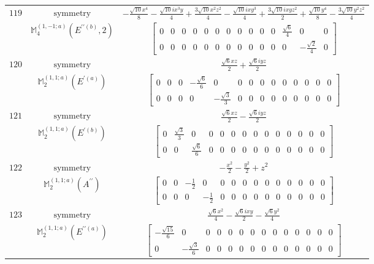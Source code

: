 \documentclass[fleqn,8pt,landscape]{jsarticle}
\begin{document}
\begin{longtable}{ccc}
$ 119 $ & $ \text{symmetry} $ & $ - \frac{\sqrt{10} x^{4}}{8} - \frac{\sqrt{10} i x^{3} y}{4} + \frac{3 \sqrt{10} x^{2} z^{2}}{4} - \frac{\sqrt{10} i x y^{3}}{4} + \frac{3 \sqrt{10} i x y z^{2}}{2} + \frac{\sqrt{10} y^{4}}{8} - \frac{3 \sqrt{10} y^{2} z^{2}}{4} $ \\
$  $ & $ \mathbb{M}_{4}^{(1,-1;a)}(E^{\prime\prime(b)},2) $ & $ \begin{bmatrix} 0 & 0 & 0 & 0 & 0 & 0 & 0 & 0 & 0 & 0 & 0 & \frac{\sqrt{6}}{4} & 0 & 0 \\ 0 & 0 & 0 & 0 & 0 & 0 & 0 & 0 & 0 & 0 & 0 & 0 & - \frac{\sqrt{2}}{4} & 0 \end{bmatrix} $ \\ \hline
$ 120 $ & $ \text{symmetry} $ & $ \frac{\sqrt{6} x z}{2} + \frac{\sqrt{6} i y z}{2} $ \\
$  $ & $ \mathbb{M}_{2}^{(1,1;a)}(E^{\prime(a)}) $ & $ \begin{bmatrix} 0 & 0 & 0 & - \frac{\sqrt{6}}{6} & 0 & 0 & 0 & 0 & 0 & 0 & 0 & 0 & 0 & 0 \\ 0 & 0 & 0 & 0 & - \frac{\sqrt{3}}{3} & 0 & 0 & 0 & 0 & 0 & 0 & 0 & 0 & 0 \end{bmatrix} $ \\ \hline
$ 121 $ & $ \text{symmetry} $ & $ \frac{\sqrt{6} x z}{2} - \frac{\sqrt{6} i y z}{2} $ \\
$  $ & $ \mathbb{M}_{2}^{(1,1;a)}(E^{\prime(b)}) $ & $ \begin{bmatrix} 0 & \frac{\sqrt{3}}{3} & 0 & 0 & 0 & 0 & 0 & 0 & 0 & 0 & 0 & 0 & 0 & 0 \\ 0 & 0 & \frac{\sqrt{6}}{6} & 0 & 0 & 0 & 0 & 0 & 0 & 0 & 0 & 0 & 0 & 0 \end{bmatrix} $ \\ \hline
$ 122 $ & $ \text{symmetry} $ & $ - \frac{x^{2}}{2} - \frac{y^{2}}{2} + z^{2} $ \\
$  $ & $ \mathbb{M}_{2}^{(1,1;a)}(A^{\prime\prime}) $ & $ \begin{bmatrix} 0 & 0 & - \frac{1}{2} & 0 & 0 & 0 & 0 & 0 & 0 & 0 & 0 & 0 & 0 & 0 \\ 0 & 0 & 0 & - \frac{1}{2} & 0 & 0 & 0 & 0 & 0 & 0 & 0 & 0 & 0 & 0 \end{bmatrix} $ \\ \hline
$ 123 $ & $ \text{symmetry} $ & $ \frac{\sqrt{6} x^{2}}{4} - \frac{\sqrt{6} i x y}{2} - \frac{\sqrt{6} y^{2}}{4} $ \\
$  $ & $ \mathbb{M}_{2}^{(1,1;a)}(E^{\prime\prime(a)}) $ & $ \begin{bmatrix} - \frac{\sqrt{15}}{6} & 0 & 0 & 0 & 0 & 0 & 0 & 0 & 0 & 0 & 0 & 0 & 0 & 0 \\ 0 & - \frac{\sqrt{3}}{6} & 0 & 0 & 0 & 0 & 0 & 0 & 0 & 0 & 0 & 0 & 0 & 0 \end{bmatrix} $ \\ \hline

\end{longtable}
\end{document}
